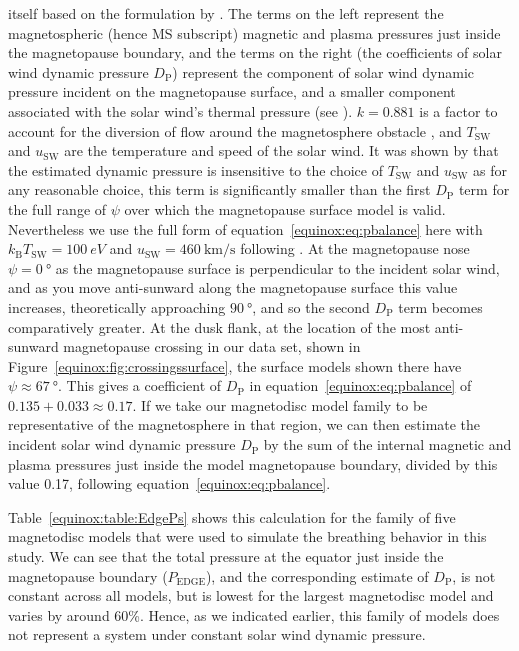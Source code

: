 itself based on the formulation by \citet{petrinec1997}. The terms on the left represent the magnetospheric (hence MS subscript) magnetic and plasma pressures just inside the magnetopause boundary, and the terms on the right (the coefficients of solar wind dynamic pressure $D_\mathrm{P}$) represent the component of solar wind dynamic pressure incident on the magnetopause surface, and a smaller component associated with the solar wind's thermal pressure (see \citet{kanani2010}). $k = 0.881$ is a factor to account for the diversion of flow around the magnetosphere obstacle \citep[see][]{spreiter1966}, and $T_\mathrm{SW}$ and $u_\mathrm{SW}$ are the temperature and speed of the solar wind. It was shown by \citet{kanani2010} that the estimated dynamic pressure is insensitive to the choice of $T_\mathrm{SW}$ and $u_\mathrm{SW}$ as for any reasonable choice, this term is significantly smaller than the first $D_\mathrm{P}$ term for the full range of $\psi$ over which the magnetopause surface model is valid. Nevertheless we use the full form of equation~\ref{equinox:eq:pbalance} here with $k_\mathrm{B}T_\mathrm{SW} = \SI{100}{eV}$ and $u_\mathrm{SW} = \SI{460}{\km\per\second}$ following \citet{pilkington2015}. At the magnetopause nose $\psi = \SI{0}{\degree}$ as the magnetopause surface is perpendicular to the incident solar wind, and as you move anti-sunward along the magnetopause surface this value increases, theoretically approaching $\SI{90}{\degree}$, and so the second $D_\mathrm{P}$ term becomes comparatively greater. At the dusk flank, at the location of the most anti-sunward magnetopause crossing in our data set, shown in Figure~\ref{equinox:fig:crossingssurface}, the surface models shown there have $\psi \approx \SI{67}{\degree}$. This gives a coefficient of $D_\mathrm{P}$ in equation~\ref{equinox:eq:pbalance} of $0.135 + 0.033 \approx 0.17$. If we take our magnetodisc model family to be representative of the magnetosphere in that region, we can then estimate the incident solar wind dynamic pressure $D_\mathrm{P}$ by the sum of the internal magnetic and plasma pressures just inside the model magnetopause boundary, divided by this value 0.17, following equation~\ref{equinox:eq:pbalance}.

Table~\ref{equinox:table:EdgePs} shows this calculation for the family of five magnetodisc models that were used to simulate the breathing behavior in this study. We can see that the total pressure at the equator just inside the magnetopause boundary ($P_\mathrm{EDGE}$), and the corresponding estimate of $D_\mathrm{P}$, is not constant across all models, but is lowest for the largest magnetodisc model and varies by around 60\%. Hence, as we indicated earlier, this family of models does not represent a system under constant solar wind dynamic pressure.

